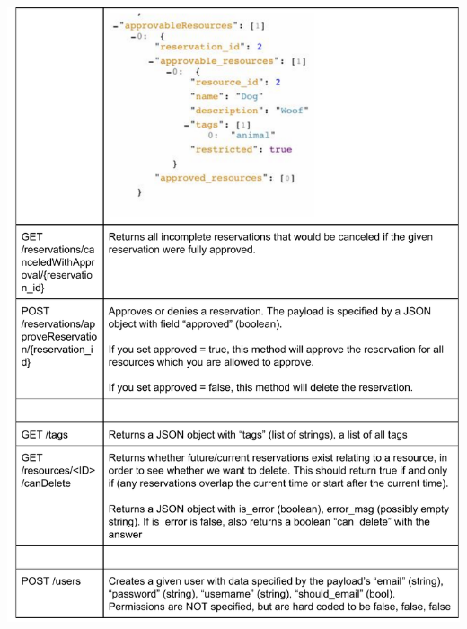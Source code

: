 \documentclass[12pt]{article}
\begin{document}
\includegraphics[width=6in]{apispec_04.pdf}
\end{document}
